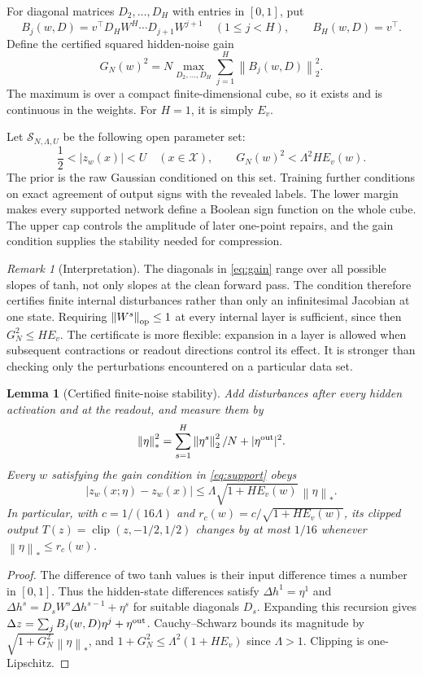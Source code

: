 \documentclass[11pt]{article}
\newtheorem{lemma}[theorem]{Lemma}
\theoremstyle{remark}\newtheorem{remark}[theorem]{Remark}
\newcommand{\norm}[1]{\left\lVert#1\right\rVert}
\newcommand{\cX}{\mathcal X}\newcommand{\cS}{\mathcal S}
\newcommand{\clip}{\operatorname{clip}}
\begin{document}
For diagonal matrices $D_2,\ldots,D_H$ with entries in $[0,1]$, put
\[
 B_j(w,D)=v^\top D_HW^H\cdots D_{j+1}W^{j+1}
 \quad(1\le j<H),\qquad B_H(w,D)=v^\top.
\]
Define the certified squared hidden-noise gain
\begin{equation}\label{eq:gain}
 G_N(w)^2=N\max_{D_2,\ldots,D_H}
                     \sum_{j=1}^H\norm{B_j(w,D)}_2^2.
\end{equation}
The maximum is over a compact finite-dimensional cube, so it exists and
is continuous in the weights. For $H=1$, it is simply $E_v$.

Let $\cS_{N,\Lambda,U}$ be the following open parameter set:
\begin{equation}\label{eq:support}
 \frac12<|z_w(x)|<U\quad(x\in\cX),\qquad
 G_N(w)^2<\Lambda^2H E_v(w).
\end{equation}
The prior is the raw Gaussian conditioned on this set. Training further
conditions on exact agreement of output signs with the revealed labels.
The lower margin makes every supported network define a Boolean sign
function on the whole cube. The upper cap controls the amplitude of later
one-point repairs, and the gain condition supplies the stability needed
for compression.

\begin{remark}[Interpretation]
The diagonals in \eqref{eq:gain} range over all possible slopes of tanh,
not only slopes at the clean forward pass. The condition therefore
certifies finite internal disturbances rather than only an infinitesimal
Jacobian at one state. Requiring $\norm{W^s}_{\rm op}\le1$ at every
internal layer is sufficient, since then $G_N^2\le H E_v$.
The certificate is more flexible: expansion in a layer is allowed when
subsequent contractions or readout directions control its effect.
It is stronger than checking only the perturbations encountered on a
particular data set.
\end{remark}

\begin{lemma}[Certified finite-noise stability]\label{lem:noise}
Add disturbances after every hidden activation and at the readout, and
measure them by
\[
 \norm\eta_*^2=\sum_{s=1}^H\norm{\eta^s}_2^2/N+|\eta^{\rm out}|^2.
\]
Every $w$ satisfying the gain condition in \eqref{eq:support} obeys
\[
 |z_w(x;\eta)-z_w(x)|
 \le\Lambda\sqrt{1+HE_v(w)}\,\norm\eta_*.
\]
In particular, with $c=1/(16\Lambda)$ and
$r_c(w)=c/\sqrt{1+HE_v(w)}$, its clipped output
$T(z)=\clip(z,-1/2,1/2)$ changes by at most $1/16$ whenever
$\norm\eta_*\le r_c(w)$.
\end{lemma}
\begin{proof}
The difference of two tanh values is their input difference times a
number in $[0,1]$. Thus the hidden-state differences satisfy
$\Delta h^1=\eta^1$ and
$\Delta h^s=D_sW^s\Delta h^{s-1}+\eta^s$ for suitable diagonals
$D_s$. Expanding this recursion gives
$\Delta z=\sum_jB_j(w,D)\eta^j+\eta^{\rm out}$.
Cauchy--Schwarz bounds its magnitude by
$\sqrt{1+G_N^2}\norm\eta_*$, and
$1+G_N^2\le\Lambda^2(1+HE_v)$ since $\Lambda>1$.
Clipping is one-Lipschitz.
\end{proof}
\end{document}
